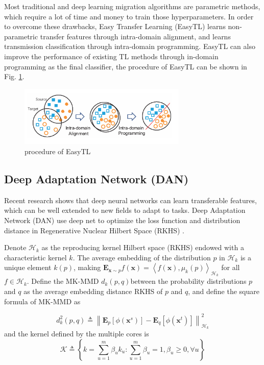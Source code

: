 \documentclass[conference]{IEEEtran}
\begin{document}
Most traditional and deep learning migration algorithms are parametric methods, which require a lot of time and money to train those hyperparameters. In order to overcome these drawbacks, Easy Transfer Learning (EasyTL) \cite{Wang2019Easy} learns non-parametric transfer features through intra-domain alignment, and learns transmission classification through intra-domain programming. EasyTL can also improve the performance of existing TL methods through in-domain programming as the final classifier, the procedure of EasyTL can be shown in Fig. \ref{kFig1}. 

\begin{center}
	\begin{figure}[htbp]
		\centering
		\label{kFig1}
		\includegraphics[width=8cm]{image/easyTL.png}
		\caption{procedure of EasyTL\cite{Wang2019Easy}}
	\end{figure}
\end{center}


\subsection{Deep Adaptation Network (DAN)}

Recent research shows that deep neural networks can learn transferable features, which can be well extended to new fields to adapt to tasks. Deep Adaptation Network (DAN) use deep net to optimize the loss function and distribution distance in Regenerative Nuclear Hilbert Space (RKHS) \cite{Long2015Learning}.

Denote $\mathcal{H}_{k}$ as the reproducing kernel Hilbert space (RKHS) endowed with a characteristic kernel $k$. The average embedding of the distribution $p$ in $\mathcal{H}_{k}$ is a unique element $k(p)$, making $\mathbf{E}_{\mathbf{x} \sim p} f(\mathbf{x})=\left\langle f( \mathbf{x}), \mu_{k}(p)\right\rangle_{\mathcal{H}_{k}}$ for all $f \in \mathcal{H}_{k}$. Define the MK-MMD $d_{k}(p, q)$between the probability distributions $p$ and $q$ as the average embedding distance RKHS of $p$ and $q$, and define the square formula of MK-MMD as

$$
d_{k}^{2}(p, q) \triangleq\left\|\mathbf{E}_{p}\left[\phi\left(\mathbf{x}^{s}\right)\right]-\mathbf{E}_{q}\left[\phi\left(\mathbf{x}^{t}\right)\right]\right\|_{\mathcal{H}_{k}}^{2}
$$
and the kernel defined by the multiple cores is
$$
\mathcal{K} \triangleq\left\{k=\sum_{u=1}^{m} \beta_{u} k_{u}: \sum_{u=1}^{m} \beta_{u}=1, \beta_{u} \geqslant 0, \forall u\right\}
$$
\end{document}
